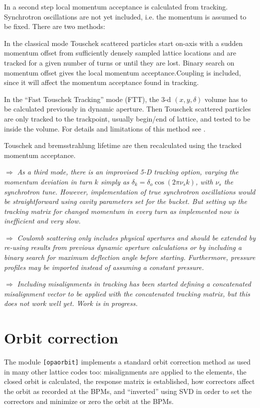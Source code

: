 \documentclass[12pt]{article}
\newcommand\todo[1]{$\Longrightarrow$ {\em #1} }
\newcommand\code[1]{{\tt [#1]}}
\begin{document}
In a second step local momentum acceptance is calculated from tracking. Synchrotron oscillations are not yet included, i.e. the momentum is assumed to be fixed. There are two methods: 

In the classical mode Touschek scattered particles start on-axis with a sudden momentum offset from sufficiently densely sampled lattice locations and are tracked for a given number of turns or until they are lost. Binary search on momentum offset gives the local momentum acceptance.Coupling is included, since it will affect the momentum acceptance found in tracking.

In the ``Fast Touschek Tracking'' mode (FTT), the 3-d $(x,y,\delta)$ volume has to be calculated previously in dynamic aperture. Then Touschek scattered particles are only tracked to the trackpoint, usually begin/end of lattice, and tested to be inside the volume. For details and limitations of this method see \cite{FTTpaper}.

Touschek and bremsstrahlung lifetime are then recalculated using the tracked momentum acceptance.

\todo{As a third mode, there is an improvised 5-D tracking option, varying the momentum deviation
in turn $k$ simply as $\delta_k = \delta_o \cos (2\pi \nu_s k)$, with $\nu_s$ the
synchrotron tune. However, implementation of true synchrotron oscillations would be straightforward using cavity parameters set for the bucket. But setting up the tracking matrix for changed momentum in every turn as implemented now is inefficient and very slow.}

\todo{Coulomb scattering only includes physical apertures and should be extended by re-using results from previous dynamic aperture calculations or by including a binary search for maximum deflection angle before starting. Furthermore, pressure profiles may be imported instead of assuming a constant pressure.}

\todo{Including misalignments in tracking has been started defining a concatenated misalignment vector to be applied with the concatenated tracking matrix, but this does not work well yet. Work is in progress.}

\section{Orbit correction}
The module \code{opaorbit} implements a standard orbit correction method as used in many other lattice codes too: misalignments are applied to the elements, the closed orbit is calculated, the response matrix is established, how correctors affect the orbit as recorded at the BPMs, and ``inverted'' using SVD \cite{numrec} in order to set the correctors and minimize or zero the orbit at the BPMs.
\end{document}
